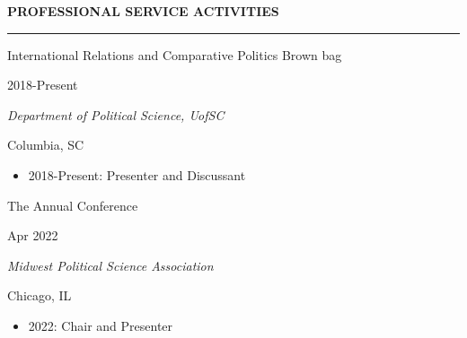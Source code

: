 \documentclass[
  16,
]{article}
\providecommand{\tightlist}{%
  \setlength{\itemsep}{0pt}\setlength{\parskip}{0pt}}\usepackage{longtable,booktabs,array}
\begin{document}
\begin{large}
  {\bf PROFESSIONAL SERVICE ACTIVITIES}
\end{large}
  \vspace{3pt}
  \hrule
  \begin{multicols}{2}
    \begin{flushleft}International Relations and Comparative Politics Brown bag\end{flushleft}
    \begin{flushright}2018-Present\end{flushright}
  \end{multicols}
  \begin{multicols}{2}
    \begin{flushleft}\textit{Department of Political Science, UofSC}\end{flushleft}
    \begin{flushright}Columbia, SC\end{flushright}
  \end{multicols}
  \vspace{-0.17cm}

\begin{itemize}
\tightlist
\item
  2018-Present: Presenter and Discussant
\end{itemize}

  \begin{multicols}{2}
    \begin{flushleft}The Annual Conference\end{flushleft}
    \begin{flushright}Apr 2022\end{flushright}
  \end{multicols}
  \begin{multicols}{2}
    \begin{flushleft}\textit{Midwest Political Science Association}\end{flushleft}
    \begin{flushright}Chicago, IL\end{flushright}
  \end{multicols}
  \vspace{-0.17cm}

\begin{itemize}
\tightlist
\item
  2022: Chair and Presenter
\end{itemize}

\vspace{7pt}
\end{document}
